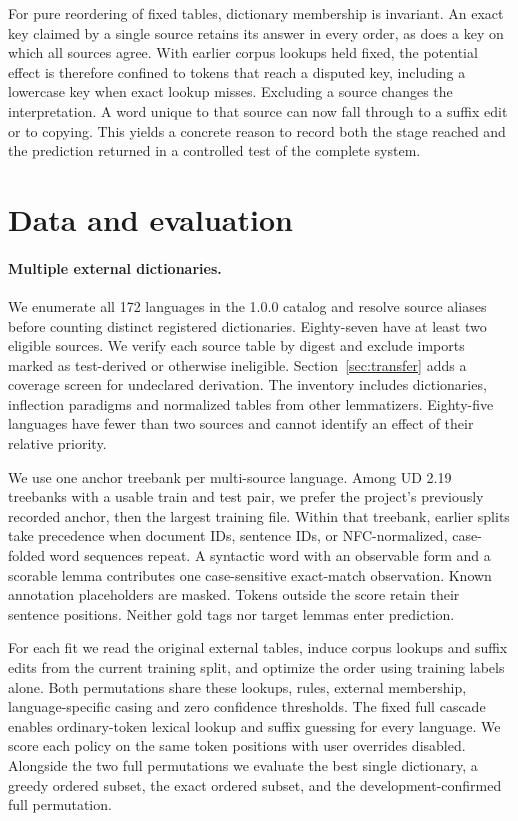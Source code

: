 \documentclass[11pt]{article}
\begin{document}
For pure reordering of fixed tables, dictionary membership is invariant.
An exact key claimed by a single source retains its answer in every order,
as does a key on which all sources agree. With earlier corpus lookups held
fixed, the potential effect is therefore confined to tokens that reach a
disputed key, including a lowercase key when exact lookup misses. Excluding
a source changes the interpretation. A word unique to that source can now
fall through to a suffix edit or to copying. This yields a concrete reason
to record both the stage reached and the prediction returned in a
controlled test of the complete system.

\section{Data and evaluation}
\label{sec:data}

\paragraph{Multiple external dictionaries.}
We enumerate all 172 languages in the 1.0.0 catalog and resolve source
aliases before counting distinct registered dictionaries. Eighty-seven have
at least two eligible sources. We verify each source table by digest
and exclude imports marked as test-derived or otherwise ineligible.
Section~\ref{sec:transfer} adds a coverage screen for undeclared derivation.
The inventory includes dictionaries, inflection paradigms and normalized
tables from other lemmatizers. Eighty-five languages have fewer than two
sources and cannot identify an effect of their relative priority.

We use one anchor treebank per multi-source language. Among UD 2.19 treebanks
with a usable train and test pair, we prefer the project's previously recorded
anchor, then the largest training file. Within that treebank, earlier splits
take precedence when document IDs, sentence IDs, or NFC-normalized,
case-folded word sequences repeat. A syntactic word with an observable form
and a scorable lemma contributes one case-sensitive exact-match observation.
Known annotation placeholders are masked. Tokens outside the score retain their
sentence positions. Neither gold tags nor target lemmas enter prediction.

For each fit we read the original external tables, induce corpus lookups and
suffix edits from the current training split, and optimize the order using
training labels alone. Both permutations share these lookups, rules, external
membership, language-specific casing and zero confidence thresholds. The fixed
full cascade enables ordinary-token lexical lookup and suffix guessing for
every language. We score each policy on the same token positions with user
overrides disabled. Alongside the two full permutations we evaluate the
best single dictionary, a greedy ordered subset, the exact ordered subset,
and the development-confirmed full permutation.
\end{document}
